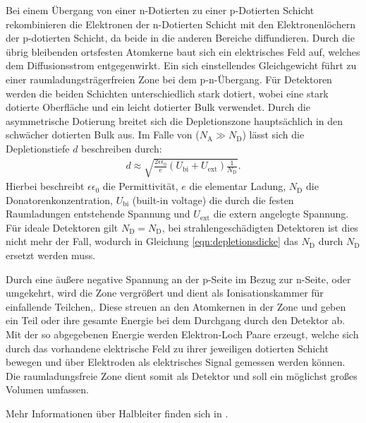 Bei einem Übergang von einer n-Dotierten zu einer p-Dotierten Schicht rekombinieren
die Elektronen der n-Dotierten Schicht mit den Elektronenlöchern der p-dotierten Schicht, da beide
in die anderen Bereiche diffundieren. Durch die übrig bleibenden ortsfesten Atomkerne
baut sich ein elektrisches Feld auf, welches dem Diffusionsstrom entgegenwirkt.
Ein sich einstellendes Gleichgewicht führt zu einer raumladungsträgerfreien Zone bei
dem p-n-Übergang.
Für Detektoren werden die beiden Schichten unterschiedlich stark dotiert, wobei eine
stark dotierte Oberfläche und ein leicht dotierter Bulk verwendet. Durch die asymmetrische
Dotierung breitet sich die Depletionszone hauptsächlich in den schwächer dotierten Bulk aus.
Im Falle von ($N_{\mathrm{A}} \gg N_{\mathrm{D}}$) lässt sich die Depletionstiefe $d$ beschreiben durch:
\begin{align}
  d \approx \sqrt{\frac{2 \epsilon \epsilon_0}{e} (U_{\mathrm{bi}}+U_{\mathrm{ext}})\frac{1}{N_{\mathrm{D}}}}.
  \label{eqn:depletionsdicke}
\end{align}
Hierbei beschreibt $\epsilon \epsilon_0$ die Permittivität, $e$ die elementar Ladung, $N_{\mathrm{D}}$ die Donatorenkonzentration, $U_{\mathrm{bi}}$ (built-in voltage)  die
durch die festen Raumladungen entstehende Spannung und $U_{\mathrm{ext}}$ die extern angelegte Spannung. Für ideale Detektoren gilt $N_{\mathrm{D}} = N_{\mathrm{D}}$, bei
strahlengeschädigten Detektoren ist dies nicht mehr der Fall, wodurch in Gleichung \ref{eqn:depletionsdicke} das $N_{\mathrm{D}}$ durch $N_{\mathrm{D}}$ ersetzt werden muss.


Durch eine äußere negative Spannung  an der p-Seite im Bezug zur n-Seite, oder umgekehrt, wird die Zone vergrößert und dient als Ionisationskammer für einfallende Teilchen,. Diese streuen
an den Atomkernen in der Zone und geben ein Teil oder ihre gesamte Energie bei dem Durchgang durch den Detektor ab. Mit der so abgegebenen
Energie werden Elektron-Loch Paare erzeugt, welche sich durch das vorhandene elektrische Feld zu ihrer jeweiligen dotierten
Schicht bewegen und über Elektroden als elektrisches Signal gemessen werden können.
Die raumladungsfreie Zone dient somit als Detektor und soll ein möglichst großes Volumen umfassen.

Mehr Informationen über Halbleiter finden sich in  \cite{semiconductor}.


